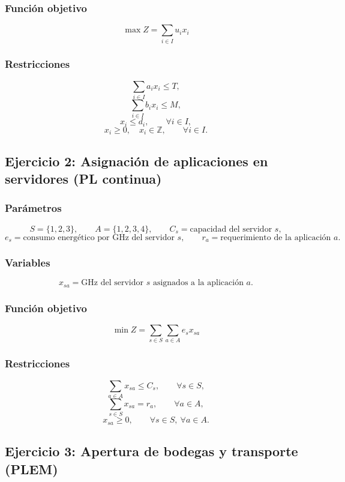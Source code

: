 \documentclass[12pt,letterpaper]{article}
\begin{document}
\subsubsection*{Función objetivo}
\[
\max Z=\sum_{i\in I}u_i x_i
\]

\subsubsection*{Restricciones}
\[
\sum_{i\in I}a_i x_i\le T,
\]
\[
\sum_{i\in I}b_i x_i\le M,
\]
\[
x_i\le d_i,\qquad \forall i\in I,
\]
\[
x_i\ge 0,\quad x_i\in\mathbb{Z},\qquad \forall i\in I.
\]

\subsection{Ejercicio 2: Asignación de aplicaciones en servidores (PL continua)}

\subsubsection*{Parámetros}
\[
S=\{1,2,3\},\qquad
A=\{1,2,3,4\},\qquad
C_s=\text{capacidad del servidor } s,
\]
\[
e_s=\text{consumo energético por GHz del servidor } s,\qquad
r_a=\text{requerimiento de la aplicación } a.
\]

\subsubsection*{Variables}
\[
x_{sa}=\text{GHz del servidor } s \text{ asignados a la aplicación } a.
\]

\subsubsection*{Función objetivo}
\[
\min Z=\sum_{s\in S}\sum_{a\in A}e_s x_{sa}
\]

\subsubsection*{Restricciones}
\[
\sum_{a\in A}x_{sa}\le C_s,\qquad \forall s\in S,
\]
\[
\sum_{s\in S}x_{sa}=r_a,\qquad \forall a\in A,
\]
\[
x_{sa}\ge 0,\qquad \forall s\in S,\ \forall a\in A.
\]

\subsection{Ejercicio 3: Apertura de bodegas y transporte (PLEM)}
\end{document}
